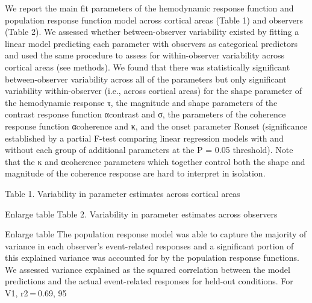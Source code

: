\documentclass{report}
\begin{document}
We report the main fit parameters of the hemodynamic response function and population response function model across cortical areas (Table 1) and observers (Table 2). We assessed whether between-observer variability existed by fitting a linear model predicting each parameter with observers as categorical predictors and used the same procedure to assess for within-observer variability across cortical areas (see methods). We found that there was statistically significant between-observer variability across all of the parameters but only significant variability within-observer (i.e., across cortical areas) for the shape parameter of the hemodynamic response τ, the magnitude and shape parameters of the contrast response function αcontrast and σ, the parameters of the coherence response function αcoherence and κ, and the onset parameter Ronset (significance established by a partial F-test comparing linear regression models with and without each group of additional parameters at the P = 0.05 threshold). Note that the κ and αcoherence parameters which together control both the shape and magnitude of the coherence response are hard to interpret in isolation.

Table 1. Variability in parameter estimates across cortical areas

Enlarge table
Table 2. Variability in parameter estimates across observers

Enlarge table
The population response model was able to capture the majority of variance in each observer’s event-related responses and a significant portion of this explained variance was accounted for by the population response functions. We assessed variance explained as the squared correlation between the model predictions and the actual event-related responses for held-out conditions. For V1, r2 = 0.69, 95%
\end{document}
